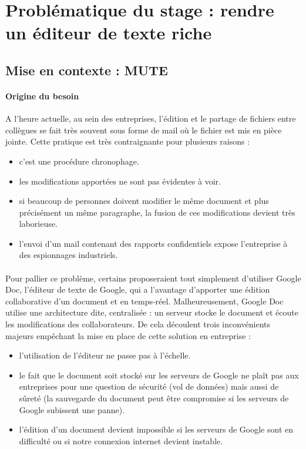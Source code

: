 \documentclass[12pt]{article}
\begin{document}
\newpage
\section{Problématique du stage : rendre un éditeur de texte riche}
\subsection{Mise en contexte : MUTE}
\paragraph{Origine du besoin}
A l'heure actuelle, au sein des entreprises, l'édition et le partage de fichiers entre collègues se fait très souvent sous forme de mail où le fichier est mis en pièce jointe. Cette pratique est très contraignante pour plusieurs raisons :\\
\begin{itemize}
    \item c'est une procédure chronophage.
    \item les modifications apportées ne sont pas évidentes à voir.
    \item si beaucoup de personnes doivent modifier le même document et plus précisément un même paragraphe, la fusion de ces modifications devient très laborieuse.
    \item l'envoi d'un mail contenant des rapports confidentiels expose l'entreprise à des espionnages industriels.
\end{itemize}
\paragraph{}
Pour pallier ce problème, certains proposeraient tout simplement d'utiliser Google Doc, l'éditeur de texte de Google, qui a l'avantage d'apporter une édition collaborative d'un document et en temps-réel. Malheureusement, Google Doc utilise une architecture dite, centralisée : un serveur stocke le document et écoute les modifications des collaborateurs. De cela découlent trois inconvénients majeurs empêchant la mise en place de cette solution en entreprise :\\
\begin{itemize}
    \item l'utilisation de l'éditeur ne passe pas à l'échelle.
    \item le fait que le document soit stocké sur les serveurs de Google ne plaît pas aux entreprises pour une question de sécurité (vol de données) mais aussi de sûreté (la sauvegarde du document peut être compromise si les serveurs de Google subissent une panne).
    \item l'édition d'un document devient impossible si les serveurs de Google sont en difficulté ou si notre connexion internet devient instable.
\end{itemize}
\end{document}
